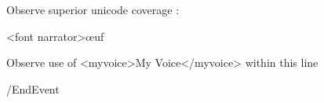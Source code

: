 




Observe superior unicode coverage :

<font narrator>œuf

Observe use of <myvoice>My Voice</myvoice> within this line

\option /EndEvent
 
